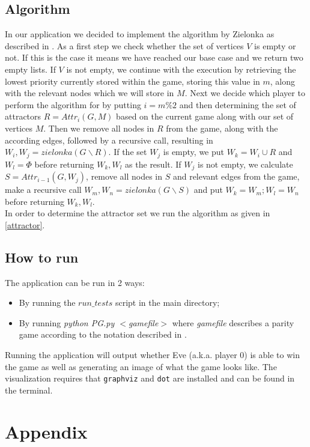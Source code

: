 \documentclass[12pt]{article}
\begin{document}
\subsection{Algorithm}
In our application we decided to implement the algorithm by Zielonka as described in \cite[~p28]{zielonka}. As a first step we check whether the set of vertices $V$ is empty or not. If this is the case it means we have reached our base case and we return two empty lists. If $V$ is not empty, we continue with the execution by retrieving the lowest priority currently stored within the game, storing this value in $m$, along with the relevant nodes which we will store in $M$. Next we decide which player to perform the algorithm for by putting $i = m\%2$ and then determining the set of attractors $R = Attr_i(G, M)$ based on the current game along with our set of vertices $M$. Then we remove all nodes in $R$ from the game, along with the according edges, followed by a recursive call, resulting in $W_i, W_j = zielonka(G \backslash R)$. If the set $W_j$ is empty, we put $W_k = W_i \cup R$ and $W_l = \Phi$ before returning $W_k, W_l$ as the result. If $W_j$ is not empty, we calculate $S = Attr_{i-1}(G, W_j)$, remove all nodes in $S$ and relevant edges from the game, make a recursive call $W_m, W_n = zielonka(G\backslash S)$ and put $W_k = W_m; W_l = W_n$ before returning $W_k, W_l$.\\
In order to determine the attractor set we run the algorithm as given in \ref{attractor}.


\subsection{How to run}
The application can be run in 2 ways:
\begin{itemize}
	\item By running the \texttt{$run\_tests$} script in the main directory;
	\item By running \textit{python PG.py $<$gamefile$>$} where \textit{gamefile} describes a parity game according to the notation described in \cite[~p32]{format}.
\end{itemize}
Running the application will output whether Eve (a.k.a. player 0) is able to win the game as well as generating an image of what the game looks like. The visualization requires that \texttt{graphviz} and \texttt{dot} are installed and can be found in the terminal.
\newpage

\section{Appendix}
\end{document}
